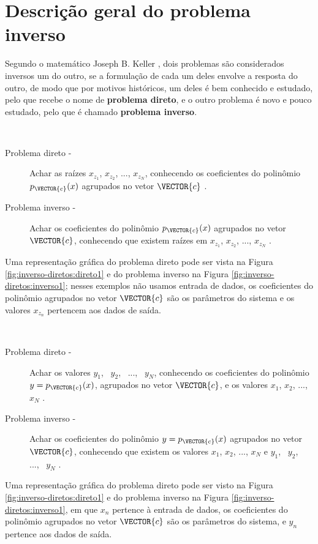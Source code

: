 
\section{Descrição geral do problema inverso}

Segundo o matemático Joseph B. Keller \cite{Keller76}, dois problemas são considerados inversos 
um do outro, se a formulação de cada um deles envolve a resposta do outro,
de modo que por motivos históricos, um deles é bem conhecido e estudado,
pelo que recebe o nome de \textbf{problema direto}, 
e o outro problema é novo e pouco estudado, pelo que é chamado \textbf{problema inverso}.
 
\begin{example}~
\begin{description}
\item[Problema direto -] Achar as raízes $x_{z_1}$, $x_{z_2}$, ..., $x_{z_N}$, 
conhecendo os coeficientes do polinômio $p_{\VECTOR{c}}(x)$ agrupados no vetor $\VECTOR{c}$  \cite{Keller76}.
\item[Problema inverso -] Achar os coeficientes do polinômio $p_{\VECTOR{c}}(x)$ agrupados no vetor $\VECTOR{c}$, 
conhecendo que existem raízes em $x_{z_1}$, $x_{z_2}$, ..., $x_{z_N}$ \cite{Keller76}.
\end{description}
Uma representação gráfica do problema direto pode ser vista na Figura \ref{fig:inverso-diretos:direto1}
e do problema inverso na Figura \ref{fig:inverso-diretos:inverso1};
nesses exemplos não usamos entrada de dados, 
os coeficientes do polinômio agrupados no vetor $\VECTOR{c}$ são os parâmetros do sistema e 
os valores $x_{z_n}$ pertencem aos dados de saída.
\end{example}

\begin{example}~
\begin{description}
\item[Problema direto -] Achar os valores $y_1$,~ $y_2$,~ ...,~ $y_N$, 
conhecendo os coeficientes do polinômio $y=p_{\VECTOR{c}}(x)$, agrupados no vetor $\VECTOR{c}$, e
os valores $x_1$, $x_2$, ..., $x_N$ \cite{Keller76}.
\item[Problema inverso -] Achar os coeficientes do polinômio $y=p_{\VECTOR{c}}(x)$ agrupados no vetor $\VECTOR{c}$, 
conhecendo que existem os valores $x_1$, $x_2$, ..., $x_N$ e 
$y_1$,~ $y_2$,~ ...,~ $y_N$  \cite{Keller76}.
\end{description}
Uma representação gráfica do problema direto pode ser visto na Figura \ref{fig:inverso-diretos:direto1}
e do problema inverso na Figura \ref{fig:inverso-diretos:inverso1}, 
em que $x_n$ pertence à entrada de dados, 
os coeficientes do polinômio agrupados no vetor $\VECTOR{c}$ são os parâmetros 
do sistema, e $y_n$ pertence aos dados de saída.
\end{example}


